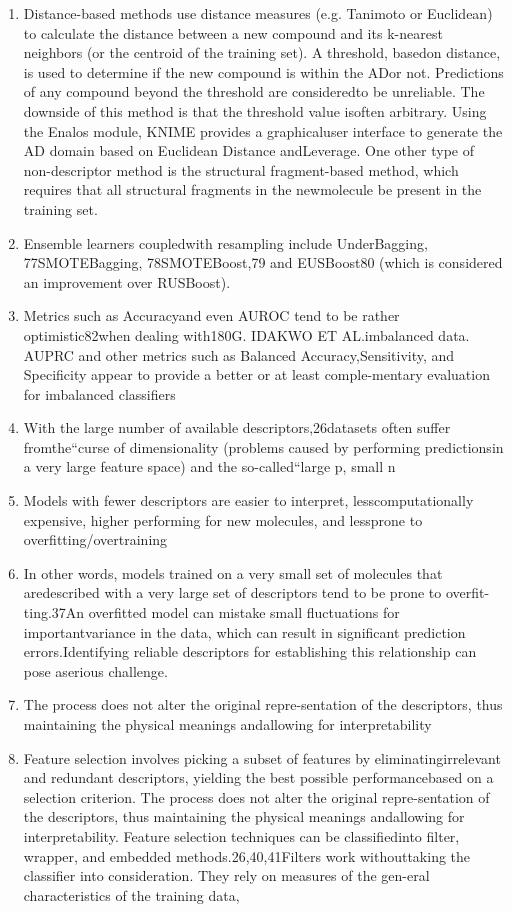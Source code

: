 \begin{enumerate}
    \item Distance-based  methods  use  distance  measures  (e.g.  Tanimoto  or Euclidean) to calculate the distance between a new compound and its k-nearest neighbors (or the centroid of the training set). A threshold, basedon distance, is used to determine if the new compound is within the ADor not. Predictions of any compound beyond the threshold are consideredto be unreliable. The downside of this method is that the threshold value isoften arbitrary. Using the Enalos module, KNIME provides a graphicaluser interface to generate the AD domain based on Euclidean Distance andLeverage. One other type of non-descriptor method is the structural fragment-based method, which requires that all structural fragments in the newmolecule be present in the training set.
    \item Ensemble learners coupledwith resampling include UnderBagging, 77SMOTEBagging, 78SMOTEBoost,79 and EUSBoost80 (which is considered an improvement over RUSBoost).
    \item Metrics such as Accuracyand even AUROC tend to be rather optimistic82when dealing with180G. IDAKWO ET AL.imbalanced data. AUPRC and other metrics such as Balanced Accuracy,Sensitivity, and Specificity appear to provide a better or at least comple-mentary evaluation for imbalanced classifiers
    \item With the large number of available descriptors,26datasets often suffer fromthe“curse of dimensionality (problems caused by performing predictionsin a very large feature space) and the so-called“large p, small n
    \item Models with fewer descriptors are easier to interpret, lesscomputationally expensive, higher performing for new molecules, and lessprone to overfitting/overtraining
    \item In other words, models trained on a very small set of molecules that aredescribed with a very large set of descriptors tend to be prone to overfit-ting.37An overfitted model can mistake small fluctuations for importantvariance in the data, which can result in significant prediction errors.Identifying reliable descriptors for establishing this relationship can pose aserious challenge.
    \item The process does not alter the original repre-sentation of the descriptors, thus maintaining the physical meanings andallowing for interpretability
    \item Feature selection involves picking a subset of features by eliminatingirrelevant and redundant descriptors, yielding the best possible performancebased on a selection criterion. The process does not alter the original repre-sentation of the descriptors, thus maintaining the physical meanings andallowing for interpretability. Feature selection techniques can be classifiedinto filter, wrapper, and embedded methods.26,40,41Filters work withouttaking the classifier into consideration. They rely on measures of the gen-eral characteristics of the training data,

\end{enumerate}
